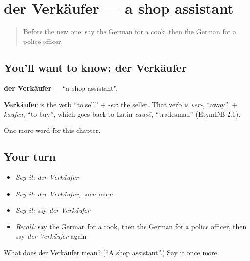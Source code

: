 \section[der Verkäufer]{der Verkäufer — a shop assistant}

\label{lesson:GE-C124-verkaeufer}



\begin{quote}
Before the new one: say the German for a cook, then the German for a police officer.
\end{quote}

\subsection*{You'll want to know: der Verkäufer}
\textbf{der Verkäufer} — \textquotedblleft{}a shop assistant\textquotedblright{}.

\begin{cousinweb}
\textbf{Verkäufer} is the verb \textquotedblleft{}to sell\textquotedblright{} + \emph{-er}: the seller. That verb is \emph{ver-}, \textquotedblleft{}away\textquotedblright{}, + \emph{kaufen}, \textquotedblleft{}to buy\textquotedblright{}, which goes back to Latin \emph{caupō}, \textquotedblleft{}tradesman\textquotedblright{} (EtymDB 2.1).
\end{cousinweb}

\begin{grammarlens}[title={What you've built}]
One more word for this chapter.
\end{grammarlens}

\subsection*{Your turn}
\begin{itemize}
\raggedright
  \item \emph{Say it:} \emph{der Verkäufer}
  \item \emph{Say it:} \emph{der Verkäufer}, once more
  \item \emph{Say it:} say \emph{der Verkäufer}
  \item \emph{Recall:} say the German for a cook, then the German for a police officer, then say \emph{der Verkäufer} again
\end{itemize}

\begin{tcolorbox}[breakable,colback=teal!4,colframe=teal!35!black,title={Before you move on}]
What does der Verkäufer mean? (\textquotedblleft{}A shop assistant\textquotedblright{}.) Say it once more.
\end{tcolorbox}
